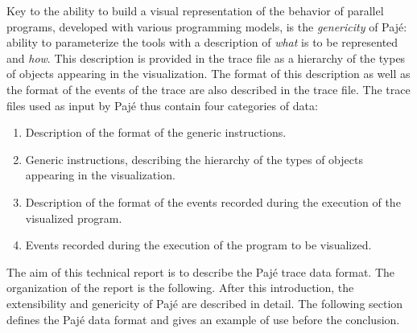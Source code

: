 Key to the ability to build a visual representation of the behavior of
parallel programs, developed with various programming models, is the
\textit{genericity} of Pajé: ability to parameterize the tools with a
description of \textit{what} is to be represented and \textit{how}.
This description is provided in the trace file as a hierarchy of the
types of objects appearing in the visualization. The format of this
description as well as the format of the events of the trace are also
described in the trace file. The trace files used as
input by Pajé thus contain four categories of data:
\begin{enumerate}
\item Description of the format of the generic instructions.
\item Generic instructions, describing the hierarchy of the types of
  objects appearing in the visualization.
\item Description of the format of the events recorded during the
  execution of the visualized program.
\item Events recorded during the execution of the program to be
  visualized.
\end{enumerate}

The aim of this technical report is to describe the Pajé trace data
format. The organization of the report is the following. After this
introduction, the extensibility and genericity of Pajé are described
in detail. The following section defines the Pajé data format and
gives an example of use before the conclusion.


